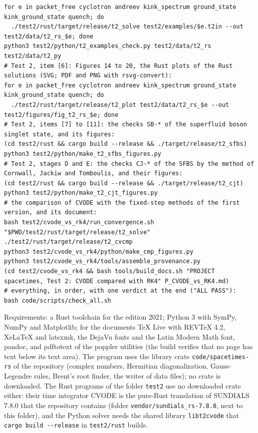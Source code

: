 \documentclass[
  10pt,
]{article}
\begin{document}
\begin{verbatim}
for e in packet_free cyclotron andreev kink_spectrum ground_state kink_ground_state quench; do
  ./test2/rust/target/release/t2_solve test2/examples/$e.t2in --out test2/data/t2_rs_$e; done
python3 test2/python/t2_examples_check.py test2/data/t2_rs test2/data/t2_py
# Test 2, item [6]: Figures 14 to 20, the Rust plots of the Rust solutions (SVG; PDF and PNG with rsvg-convert):
for e in packet_free cyclotron andreev kink_spectrum ground_state kink_ground_state quench; do
  ./test2/rust/target/release/t2_plot test2/data/t2_rs_$e --out test2/figures/fig_t2_rs_$e; done
# Test 2, items [7] to [11]: the checks SB-* of the superfluid boson singlet state, and its figures:
(cd test2/rust && cargo build --release && ./target/release/t2_sfbs)
python3 test2/python/make_t2_sfbs_figures.py
# Test 2, stages D and E: the checks CJ-* of the SFBS by the method of Cornwall, Jackiw and Tomboulis, and their figures:
(cd test2/rust && cargo build --release && ./target/release/t2_cjt)
python3 test2/python/make_t2_cjt_figures.py
# the comparison of CVODE with the fixed-step methods of the first version, and its document:
bash test2/cvode_vs_rk4/run_convergence.sh "$PWD/test2/rust/target/release/t2_solve"
./test2/rust/target/release/t2_cvcmp
python3 test2/cvode_vs_rk4/python/make_cmp_figures.py
python3 test2/cvode_vs_rk4/tools/assemble_provenance.py
(cd test2/cvode_vs_rk4 && bash tools/build_docs.sh "PROJECT spacetimes, Test 2: CVODE compared with RK4" P_CVODE_vs_RK4.md)
# everything, in order, with one verdict at the end ("ALL PASS"):
bash code/scripts/check_all.sh
\end{verbatim}

Requirements: a Rust toolchain for the edition 2021; Python 3 with
SymPy, NumPy and Matplotlib; for the documents TeX Live with REVTeX 4.2,
XeLaTeX and latexmk, the DejaVu fonts and the Latin Modern Math font,
pandoc, and pdftotext of the poppler utilities (the build verifies that
no page has text below its text area). The program uses the library
crate \texttt{code/spacetimes-rs} of the repository (complex numbers,
Hermitian diagonalization, Gauss-Legendre rules, Brent's root finder,
the writer of data files); no crate is downloaded. The Rust programs of
the folder \texttt{test2} use no downloaded crate either: their time
integrator CVODE is the pure-Rust translation of SUNDIALS 7.8.0 that the
repository contains (folder \texttt{vendor/sundials\_rs-7.8.0}, next to
this folder), and the Python solver needs the shared library
\texttt{libt2cvode} that \texttt{cargo\ build\ -\/-release} in
\texttt{test2/rust} builds.
\end{document}
